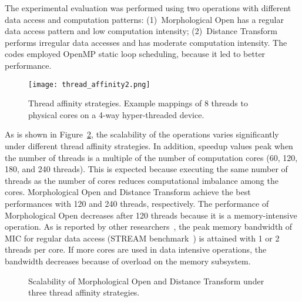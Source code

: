 The experimental evaluation was performed using two operations with different 
data access and computation patterns: (1)~Morphological Open has a regular data
access pattern and low computation intensity; (2)~Distance Transform performs
irregular data accesses and has moderate computation intensity. The codes 
employed OpenMP static loop scheduling, because it led to better performance. 
\begin{figure}[htb!]
\begin{center}
        \texttt{[image: thread\_affinity2.png]}
\vspace*{-1ex}
\caption{Thread affinity strategies. Example mappings of 8 threads to physical 
cores on a 4-way hyper-threaded device.}
\vspace*{-3ex}
\label{fig:affinity}
\end{center}
\end{figure}

As is shown in Figure~\ref{fig:opts-scalability}, the scalability of the operations 
varies significantly under different thread affinity strategies. In addition, speedup 
values peak when the number of threads is a multiple of the number of computation cores 
(60, 120, 180, and 240 threads). This is expected because executing the same number of 
threads as the number of cores reduces computational imbalance among the cores. 
Morphological Open and Distance Transform achieve the best performances with 
120 and 240 threads, respectively. The performance of Morphological Open decreases after
120 threads because it is a memory-intensive operation. As is reported by other 
researchers~\cite{McCalpin1995,DBLP:conf/ipps/SauleC12}, the peak memory bandwidth of 
MIC for regular data access (STREAM benchmark~\cite{McCalpin1995}) is
attained with 1 or 2 threads per core. If more cores are
used in data intensive operations, the bandwidth decreases because of  
overload on the memory subsystem.
\begin{figure}[htb!]
\begin{center}
\vspace*{-1ex}
\caption{Scalability of Morphological Open and Distance Transform under three 
thread affinity strategies.}
\vspace*{-3ex}
\label{fig:opts-scalability}
\end{center}
\end{figure}

